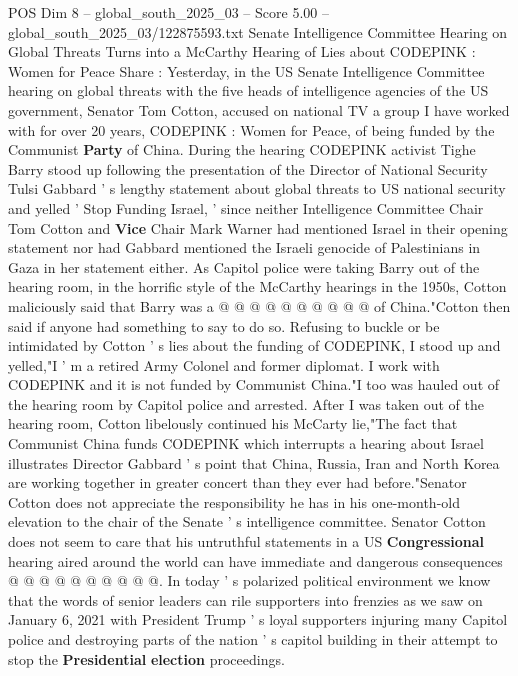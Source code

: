 \begin{textsample}{POS Dim 8 – global\_south\_2025\_03 – Score 5.00 – global\_south\_2025\_03/122875593.txt}  \label{ex:f8_pos_379}
Senate Intelligence Committee Hearing on Global Threats Turns into a McCarthy Hearing of Lies about CODEPINK : Women for Peace Share : Yesterday, in the US Senate Intelligence Committee hearing on global threats with the five heads of intelligence agencies of the US government, Senator Tom Cotton, accused on national TV a group I have worked with for over 20 years, CODEPINK : Women for Peace, of being funded by the Communist \textbf{Party} of China.
During the hearing CODEPINK activist Tighe Barry stood up following the presentation of the Director of National Security Tulsi Gabbard ' s lengthy statement about global threats to US national security and yelled ' Stop Funding Israel, ' since neither Intelligence Committee Chair Tom Cotton and \textbf{Vice} Chair Mark Warner had mentioned Israel in their opening statement nor had Gabbard mentioned the Israeli genocide of Palestinians in Gaza in her statement either.
As Capitol police were taking Barry out of the hearing room, in the horrific style of the McCarthy hearings in the 1950s, Cotton maliciously said that Barry was a @ @ @ @ @ @ @ @ @ @ of China."Cotton then said if anyone had something to say to do so.
Refusing to buckle or be intimidated by Cotton ' s lies about the funding of CODEPINK, I stood up and yelled,"I ' m a retired Army Colonel and former diplomat.
I work with CODEPINK and it is not funded by Communist China."I too was hauled out of the hearing room by Capitol police and arrested.
After I was taken out of the hearing room, Cotton libelously continued his McCarty lie,"The fact that Communist China funds CODEPINK which interrupts a hearing about Israel illustrates Director Gabbard ' s point that China, Russia, Iran and North Korea are working together in greater concert than they ever had before."Senator Cotton does not appreciate the responsibility he has in his one-month-old elevation to the chair of the Senate ' s intelligence committee.
Senator Cotton does not seem to care that his untruthful statements in a US \textbf{Congressional} hearing aired around the world can have immediate and dangerous consequences @ @ @ @ @ @ @ @ @ @.
In today ' s polarized political environment we know that the words of senior leaders can rile supporters into frenzies as we saw on January 6, 2021 with President Trump ' s loyal supporters injuring many Capitol police and destroying parts of the nation ' s capitol building in their attempt to stop the \textbf{Presidential} \textbf{election} proceedings.

\end{textsample}
